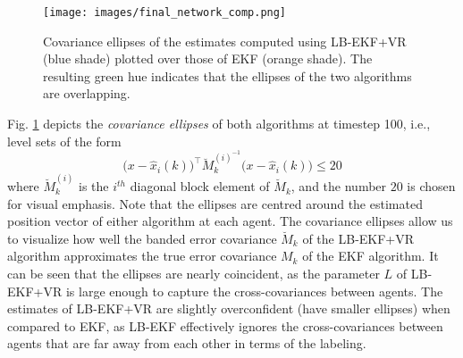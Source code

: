 \documentclass[twocolumn]{article}
\theoremstyle{plain}
\theoremstyle{definition}
\theoremstyle{definition}
\theoremstyle{remark}
\begin{document}
\begin{figure}[h]
\centering
\texttt{[image: images/final\_network\_comp.png]}
\caption{Covariance ellipses of the estimates computed using LB-EKF+VR (blue shade) plotted over those of EKF (orange shade). The resulting green hue indicates that the ellipses of the two algorithms are overlapping.}
\label{fig:network_final}
\end{figure}
Fig. \ref{fig:network_final} depicts the \textit{covariance ellipses} of both algorithms at timestep 100, i.e., level sets of the form
\begin{equation*}
    \big(x - \hat x_i(k)\big)^\top \breve M_k^{(i)^{-1}}\big(x - \hat x_i(k)\big) \leq 20
\end{equation*}
where $\breve M_k^{(i)}$ is the $i^{th}$ diagonal block element of $\breve M_k$, and the number $20$ is chosen for visual emphasis. Note that the ellipses are centred around the estimated position vector of either algorithm at each agent.
The covariance ellipses allow us to visualize how well the banded error covariance $\breve M_k$ of the LB-EKF+VR algorithm approximates the true error covariance $M_k$ of the EKF algorithm. It can be seen that the ellipses are nearly coincident, as the parameter $L$ of LB-EKF+VR is large enough to capture the cross-covariances between agents. The estimates of LB-EKF+VR are slightly overconfident (have smaller ellipses) when compared to EKF, as LB-EKF effectively ignores the cross-covariances between agents that are far away from each other in terms of the labeling. 
\end{document}
